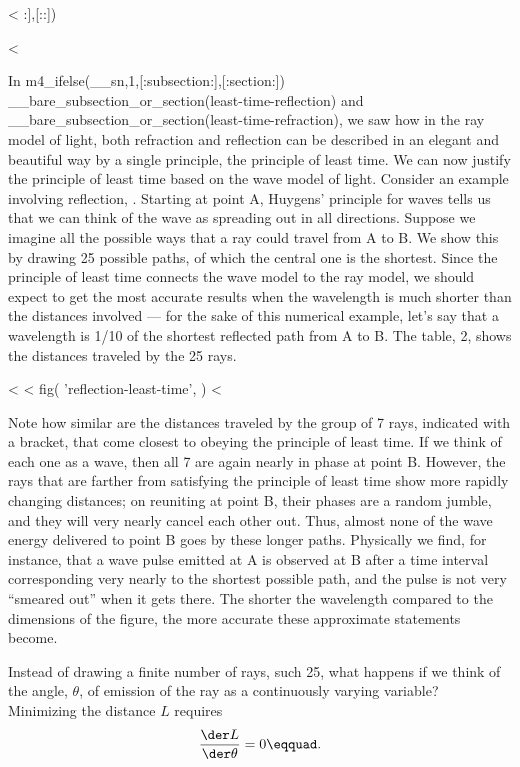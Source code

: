 <%
:],[::]) %

<%

In m4_ifelse(__sn,1,[:subsection:],[:section:]) 
__bare_subsection_or_section(least-time-reflection) 
and
__bare_subsection_or_section(least-time-refraction),
we saw how in the ray model of
light, both refraction and reflection can be described in an
elegant and beautiful way by a single principle, the
principle of least time. We can now justify the principle of
least time based on the wave model of light. Consider an
example involving reflection, . Starting at point A,
Huygens' principle for waves tells us that we can think of
the wave as spreading out in all directions. Suppose we
imagine all the possible ways that a ray could travel from A
to B. We show this by drawing 25 possible paths, of which
the central one is the shortest. Since the principle of
least time connects the wave model to the ray model, we
should expect to get the most accurate results when the
wavelength is much shorter than the distances involved ---
for the sake of this numerical example, let's say that a
wavelength is 1/10 of the shortest reflected path from A to
B. The table, 2, shows the distances traveled by the 25 rays.

<%
<%
  fig(
    'reflection-least-time',
  )
<%

Note how similar are the distances traveled by the group of
7 rays, indicated with a bracket, that come closest to
obeying the principle of least time. If we think of each one
as a wave, then all 7 are again nearly in phase at point
B. However, the rays that are farther from satisfying the
principle of least time show more rapidly changing
distances; on reuniting at point B, their phases are a
random jumble, and they will very nearly cancel each other
out. Thus, almost none of the wave energy delivered to point
B goes by these longer paths. Physically we find, for
instance, that a wave pulse emitted at A is observed at B
after a time interval corresponding very nearly to the
shortest possible path, and the pulse is not very ``smeared
out'' when it gets there. The shorter the wavelength
compared to the dimensions of the figure, the more accurate
these approximate statements become.

Instead of drawing a finite number of rays, such 25, what
happens if we think of the angle, $\theta $, of emission of
the ray as a continuously varying variable? Minimizing the
distance $L$ requires
\begin{equation*}
        \frac{\der L}{\der\theta} = 0\eqquad.
\end{equation*}

